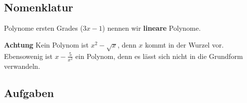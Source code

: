 \subsection{Nomenklatur}
Polynome ersten Grades (\zB $ 3x-1$) nennen wir \textbf{lineare}
Polynome.


\textbf{Achtung} Kein Polynom ist $x^2 - \sqrt{x}$, denn $x$ kommt in
der Wurzel vor. Ebensowenig ist $x - \frac{5}{x^2}$ ein Polynom, denn
es lässt sich nicht in die Grundform verwandeln.

\subsection*{Aufgaben}
